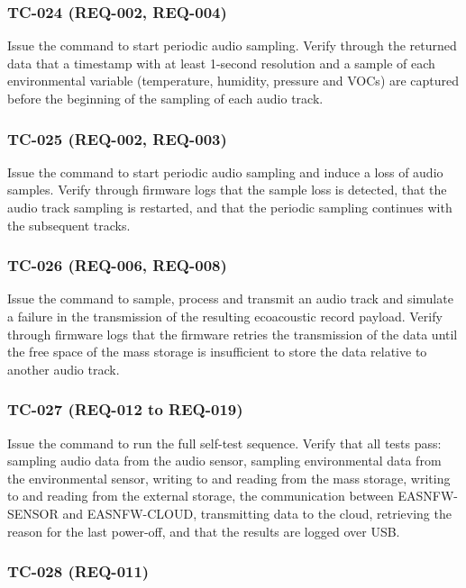 \documentclass[11pt,a4paper]{article}
\begin{document}
\subsubsection{TC-024 (REQ-002, REQ-004)}

Issue the command to start periodic audio sampling. Verify through the returned
data that a timestamp with at least 1-second resolution and a sample of each
environmental variable (temperature, humidity, pressure and VOCs) are captured
before the beginning of the sampling of each audio track.

\subsubsection{TC-025 (REQ-002, REQ-003)}

Issue the command to start periodic audio sampling and induce a loss of audio
samples. Verify through firmware logs that the sample loss is detected, that
the audio track sampling is restarted, and that the periodic sampling continues
with the subsequent tracks.

\subsubsection{TC-026 (REQ-006, REQ-008)}

Issue the command to sample, process and transmit an audio track and simulate a
failure in the transmission of the resulting ecoacoustic record payload. Verify
through firmware logs that the firmware retries the transmission of the data
until the free space of the mass storage is insufficient to store the data
relative to another audio track.

\subsubsection{TC-027 (REQ-012 to REQ-019)}

Issue the command to run the full self-test sequence. Verify that all tests
pass: sampling audio data from the audio sensor, sampling environmental data
from the environmental sensor, writing to and reading from the mass storage,
writing to and reading from the external storage, the communication between
EASNFW-SENSOR and EASNFW-CLOUD, transmitting data to the cloud, retrieving the
reason for the last power-off, and that the results are logged over USB.

\subsubsection{TC-028 (REQ-011)}
\end{document}
